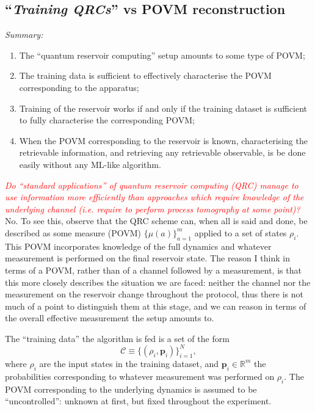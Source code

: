 \documentclass[12pt]{report}
\newcommand{\RR}{\mathbb{R}}
\newcommand{\bs}[1]{\boldsymbol{#1}}
\newcommand{\calC}{{\mathcal{C}}}
\begin{document}
\subsection{``\emph{Training QRCs}'' vs POVM reconstruction}
\emph{Summary:}
\begin{enumerate}
	\item The ``quantum reservoir computing'' setup amounts to some type of POVM;
	\item The training data is sufficient to effectively characterise the POVM corresponding to the apparatus;
	\item Training of the reservoir works if and only if the training dataset is sufficient to fully characterise the corresponding POVM;
	\item When the POVM corresponding to the reservoir is known, characterising the retrievable information, and retrieving any retrievable observable, is be done easily without any ML-like algorithm.
\end{enumerate}

\textcolor{red}{\emph{Do ``standard applications'' of quantum reservoir computing (QRC) manage to use information more efficiently than approaches which require knowledge of the underlying channel (\emph{i.e.} require to perform process tomography at some point)?}}
No. To see this, observe that the QRC scheme can, when all is said and done, be described as some measure (POVM) $\{\mu(a)\}_{a=1}^m$ applied to a set of states $\rho_i$. This POVM incorporates knowledge of the full dynamics and whatever measurement is performed on the final reservoir state.
The reason I think in terms of a POVM, rather than of a channel followed by a measurement, is that this more closely describes the situation we are faced: neither the channel nor the measurement on the reservoir change throughout the protocol, thus there is not much of a point to distinguish them at this stage, and we can reason in terms of the overall effective measurement the setup amounts to.

The ``training data'' the algorithm is fed is a set of the form
\begin{equation}
	\calC \equiv \{ (\rho_i, \bs p_i) \}_{i=1}^N,
\end{equation}
where $\rho_i$ are the input states in the training dataset, and $\bs p_i\in\RR^m$ the probabilities corresponding to whatever measurement was performed on $\rho_i$.
The POVM corresponding to the underlying dynamics is assumed to be ``uncontrolled'': unknown at first, but fixed throughout the experiment.
\end{document}
